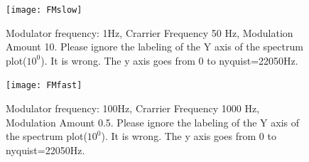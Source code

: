 \begin{figure}[h!]
	\centering
	\texttt{[image: FMslow]}
	\caption[shortCaption]
	{Modulator frequency: 1Hz, Crarrier Frequency 50 Hz, Modulation Amount 10. Please ignore the labeling of the Y axis of the spectrum plot($10^0$). It is wrong. The y axis goes from 0 to nyquist=22050Hz.}
	\label{fig:fmSlow}
\end{figure}


\begin{figure}[h!]
	\centering
	\texttt{[image: FMfast]}
	\caption[shortCaption]
	{Modulator frequency: 100Hz, Crarrier Frequency 1000 Hz, Modulation Amount 0.5. Please ignore the labeling of the Y axis of the spectrum plot($10^0$). It is wrong. The y axis goes from 0 to nyquist=22050Hz.}
	\label{fig:fmFast}
\end{figure}


